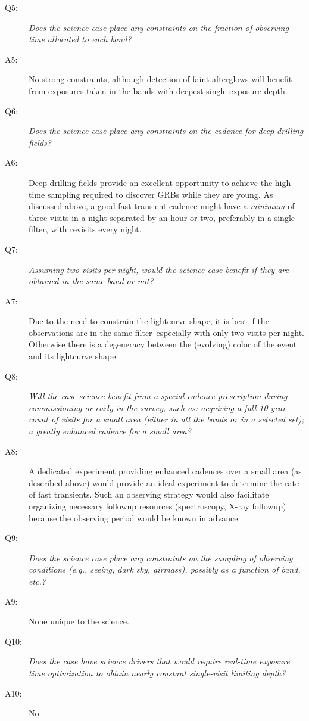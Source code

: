 \begin{description}
\item[Q5:] {\it Does the science case place any constraints on the
fraction of observing time allocated to each band?}

\item[A5:] No strong constraints, although detection of faint afterglows
	will benefit from exposures taken in the bands with deepest
		single-exposure depth.

\item[Q6:] {\it Does the science case place any constraints on the
cadence for deep drilling fields?}

\item[A6:] Deep drilling fields provide an excellent opportunity to achieve
	the high time sampling required to discover GRBs while they are
		young.  As discussed above, a good fast transient cadence
		might have a \textit{minimum} of three visits
		in a night separated by an hour or two, preferably in a
		single filter, with revisits every night.

\item[Q7:] {\it Assuming two visits per night, would the science case
benefit if they are obtained in the same band or not?}

\item[A7:] Due to the need to constrain the lightcurve shape, it is best if
	the observations are in the same filter--especially with only two
	visits per night.  Otherwise there is a degeneracy between the
	(evolving) color of the event and its lightcurve shape.

\item[Q8:] {\it Will the case science benefit from a special cadence
prescription during commissioning or early in the survey, such as:
acquiring a full 10-year count of visits for a small area (either in all
the bands or in a  selected set); a greatly enhanced cadence for a small
area?}

\item[A8:] A dedicated experiment providing enhanced cadences over a small
	area  (as described above) would provide an ideal
	experiment to determine the rate of fast transients.  Such an
	observing strategy would also
	facilitate organizing necessary followup resources
	(spectroscopy, X-ray followup) because the observing period would
	be known in advance.

\item[Q9:] {\it Does the science case place any constraints on the
sampling of observing conditions (e.g., seeing, dark sky, airmass),
possibly as a function of band, etc.?}

\item[A9:] None unique to the science.

\item[Q10:] {\it Does the case have science drivers that would require
real-time exposure time optimization to obtain nearly constant
single-visit limiting depth?}

\item[A10:] No.

\end{description}

\navigationbar
